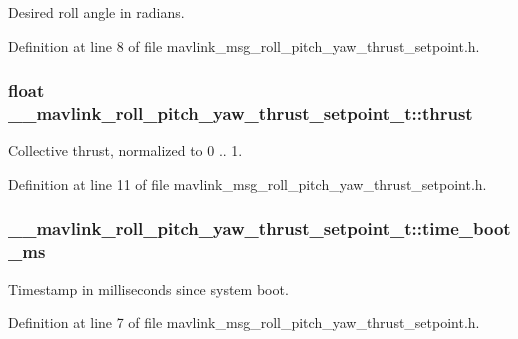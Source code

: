 Desired roll angle in radians. 



Definition at line 8 of file mavlink\-\_\-msg\-\_\-roll\-\_\-pitch\-\_\-yaw\-\_\-thrust\-\_\-setpoint.\-h.

\hypertarget{struct____mavlink__roll__pitch__yaw__thrust__setpoint__t_a8308ca5218b9c676b545b96689ef0183}{
\subsubsection[{thrust}]{\setlength{\rightskip}{0pt plus 5cm}float \-\_\-\-\_\-mavlink\-\_\-roll\-\_\-pitch\-\_\-yaw\-\_\-thrust\-\_\-setpoint\-\_\-t\-::thrust}}\label{struct____mavlink__roll__pitch__yaw__thrust__setpoint__t_a8308ca5218b9c676b545b96689ef0183}


Collective thrust, normalized to 0 .. 1. 



Definition at line 11 of file mavlink\-\_\-msg\-\_\-roll\-\_\-pitch\-\_\-yaw\-\_\-thrust\-\_\-setpoint.\-h.

\hypertarget{struct____mavlink__roll__pitch__yaw__thrust__setpoint__t_ae474dbaeb814206cd136f31fdc75a67b}{
\subsubsection[{time\-\_\-boot\-\_\-ms}]{ \-\_\-\-\_\-mavlink\-\_\-roll\-\_\-pitch\-\_\-yaw\-\_\-thrust\-\_\-setpoint\-\_\-t\-::time\-\_\-boot\-\_\-ms}}\label{struct____mavlink__roll__pitch__yaw__thrust__setpoint__t_ae474dbaeb814206cd136f31fdc75a67b}


Timestamp in milliseconds since system boot. 



Definition at line 7 of file mavlink\-\_\-msg\-\_\-roll\-\_\-pitch\-\_\-yaw\-\_\-thrust\-\_\-setpoint.\-h.


